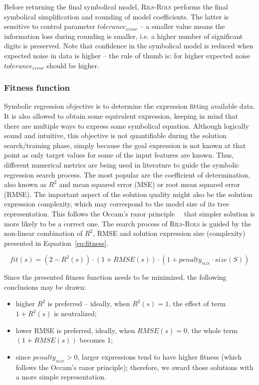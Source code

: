 \documentclass[a4paper,12pt]{elsarticle}
\begin{document}
Before returning the final symbolical model, \textsc{Rils}-\textsc{Rols}  performs the final symbolical simplification and rounding of model coefficients. The latter is sensitive to control parameter $tolerance_{error}$ -- a smaller value means the information loss during rounding is smaller, i.e. a higher number of significant digits is preserved. Note that confidence in the symbolical model is reduced when expected noise in data is higher -- the rule of thumb is: for higher expected noise $tolerance_{error}$ should be higher. 

\subsubsection{Fitness function}\label{sec:fitness}

Symbolic regression objective is to determine the expression fitting available data. It is also allowed to obtain some equivalent expression, keeping in mind that there are multiple ways to express some symbolical equation. Although logically sound and intuitive, this objective is not quantifiable during the solution search/training phase, simply because the goal expression is not known at that point as only target values for some of the input features are known. Thus, different numerical metrics are being used in literature to guide the symbolic regression search process. The most popular are the coefficient of determination, also known as $R^2$ and mean squared error (MSE) or root mean squared error (RMSE). The important aspect of the solution quality might also be the solution expression complexity, which may correspond to the model size of its tree representation. This follows the Occam's razor principle~\cite{costa2020fast}~ that simpler solution  is more likely to be a correct one. 
The search process of \textsc{Rils}-\textsc{Rols}  is guided by the non-linear combination of $R^2$, RMSE and solution expression size (complexity) presented in Equation~\ref{eq:fitness}. 
 
\begin{equation}
	\label{eq:fitness}
	fit(s) = (2-R^2(s)) \cdot (1+RMSE(s)) \cdot (1+penalty_{size} \cdot size(S))
\end{equation}

Since the presented fitness function needs to be minimized, the following conclusions may be drawn:
\begin{itemize}
	\item higher $R^2$ is preferred -- ideally, when $R^2(s)=1$, the effect of term $1+R^2(s)$ is neutralized; %
	\item lower RMSE is preferred, ideally, when $RMSE(s)=0$, the whole term $(1+RMSE(s))$ becomes 1;
	\item since $penalty_{size} > 0$, larger expressions tend to have higher fitness (which follows the Occam's razor principle); therefore, we award those solutions with a more simple representation. 
\end{itemize}
\end{document}
